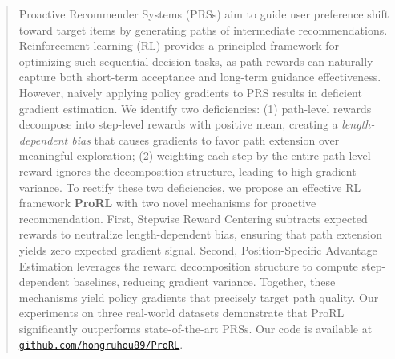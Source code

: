 \begin{abstract}
    Proactive Recommender Systems (PRSs) aim to guide user preference shift toward target items by generating paths of intermediate recommendations. Reinforcement learning (RL) provides a principled framework for optimizing such sequential decision tasks, as path rewards can naturally capture both short-term acceptance and long-term guidance effectiveness. However, naively applying policy gradients to PRS results in deficient gradient estimation. We identify two deficiencies: (1) path-level rewards decompose into step-level rewards with positive mean, creating a \emph{length-dependent bias} that causes gradients to favor path extension over meaningful exploration; (2) weighting each step by the entire path-level reward ignores the decomposition structure, leading to high gradient variance. To rectify these two deficiencies, we propose an effective RL framework \textbf{ProRL} with two novel mechanisms for proactive recommendation. First, Stepwise Reward Centering subtracts expected rewards to neutralize length-dependent bias, ensuring that path extension yields zero expected gradient signal. Second, Position-Specific Advantage Estimation leverages the reward decomposition structure to compute step-dependent baselines, reducing gradient variance. Together, these mechanisms yield policy gradients that precisely target path quality. Our experiments on three real-world datasets demonstrate that ProRL significantly outperforms state-of-the-art PRSs. Our code is available at \href{https://github.com/hongruhou89/ProRL}{\texttt{github.com/hongruhou89/ProRL}}.
\end{abstract}


